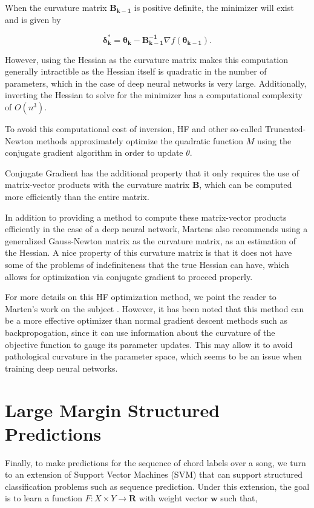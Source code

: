 \documentclass{article}
\begin{document}
When the curvature matrix $\mathbf{B_{k-1}}$ is positive definite, the minimizer will
exist and is given by

\[
  \mathbf{\delta^{*}_{k}} =
  \mathbf{\theta_k} - \mathbf{B^{-1}_{k-1}} \nabla f(\mathbf{\theta_{k-1}}).
\]

However, using the Hessian as the curvature matrix makes this computation
generally intractible as the Hessian itself is quadratic in the number
of parameters, which in the case of deep neural networks is very large.
Additionally, inverting the Hessian to solve for the minimizer has a computational
complexity of $O(n^3)$.

To avoid this computational cost of inversion, HF and other so-called
Truncated-Newton methods approximately optimize the quadratic function $M$
using the conjugate gradient algorithm in order to update $\theta$.

Conjugate Gradient has the additional property that it only requires the use
of matrix-vector products with the curvature matrix $\mathbf{B}$, which can
be computed more efficiently than the entire matrix.

In addition to providing a method to compute these matrix-vector products efficiently
in the case of a deep neural network, Martens also recommends using a generalized
Gauss-Newton matrix as the curvature matrix, as an estimation of the Hessian.
A nice property of this curvature matrix is that it does not have some of the
problems of indefiniteness that the true Hessian can have, which allows for 
optimization via conjugate gradient to proceed properly. 

For more details on this HF optimization method, we point the reader to
Marten's work on the subject \cite{martens2010deep}. However, it has been noted
that this method can be a more effective optimizer than normal gradient descent
methods such as backpropogation, since it can use information about the curvature
of the objective function to gauge its parameter updates. This may allow it
to avoid pathological curvature in the parameter space, which seems to be an
issue when training deep neural networks.

\section{Large Margin Structured Predictions}

Finally, to make predictions for the sequence of chord labels over a song,
we turn to an extension of Support Vector Machines (SVM) that can support
structured classification problems such as sequence prediction. Under this
extension, the goal is to learn a function $F : X \times Y \rightarrow
\mathbf{R}$ with weight vector $\mathbf{w}$ such that,
\end{document}
